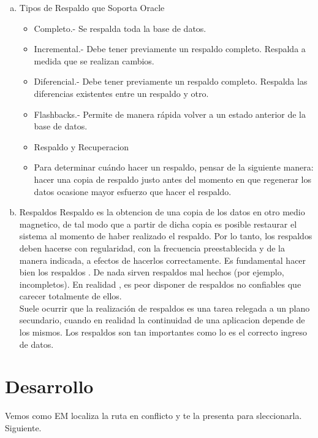 \documentclass[a4paper,twocolumn,10pt]{article}
\begin{document}
\begin{enumerate}[a)]
    \item Tipos de Respaldo que Soporta Oracle
   \begin{itemize}
          \item Completo.- Se respalda toda la base de datos.
          \item Incremental.- Debe tener previamente un respaldo completo. Respalda a medida que se realizan cambios.
          \item 	Diferencial.- Debe tener previamente un respaldo completo. Respalda las diferencias existentes entre un respaldo y otro.
          \item Flashbacks.- Permite de manera rápida volver a un estado anterior de la base de datos.
          \item Respaldo y Recuperacion
          \item Para determinar cu\'ando hacer un respaldo, pensar de la siguiente manera: hacer una copia de respaldo justo antes del momento en que regenerar los datos ocasione mayor esfuerzo que hacer el respaldo.
       \end{itemize}
   \item Respaldos
      \normalsize Respaldo es la obtencion de una copia de los datos en otro medio magnetico, de tal modo que a partir de dicha copia es posible restaurar el sistema al momento de haber realizado el respaldo. Por lo tanto, los respaldos deben hacerse con regularidad, con la frecuencia preestablecida y de la manera indicada, a efectos de hacerlos correctamente. Es fundamental hacer bien los respaldos . De nada sirven respaldos mal hechos (por ejemplo, incompletos). En realidad , es peor disponer de respaldos no confiables que carecer totalmente de ellos. \\
 Suele ocurrir que la realizaci\'on de respaldos es una tarea relegada a un plano secundario, cuando en realidad la continuidad de una aplicacion depende de los mismos. Los respaldos son tan importantes como lo es el correcto ingreso de datos.
\end{enumerate}

\section{Desarrollo}

          \normalsize Vemos como EM localiza la ruta en conflicto y te la presenta para sleccionarla. Siguiente.\\ \\
          
\end{document}
